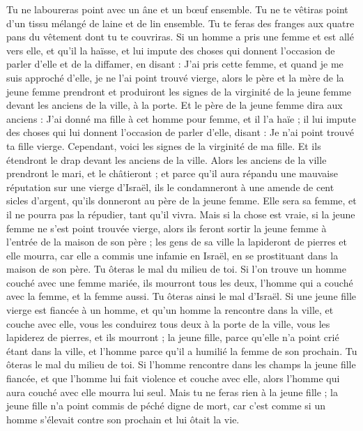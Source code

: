 \begin{multicols}{2}
Tu ne laboureras point avec un âne et un bœuf ensemble.
Tu ne te vêtiras point d'un tissu mélangé de laine et de lin ensemble.
Tu te feras des franges aux quatre pans du vêtement dont tu te couvriras.
Si un homme a pris une femme et est allé vers elle, et qu'il la haïsse,
et lui impute des choses qui donnent l'occasion de parler d'elle et de la diffamer, en disant : J'ai pris cette femme, et quand je me suis approché d'elle, je ne l'ai point trouvé vierge,
alors le père et la mère de la jeune femme prendront et produiront les signes de la virginité de la jeune femme devant les anciens de la ville, à la porte.
Et le père de la jeune femme dira aux anciens : J'ai donné ma fille à cet homme pour femme, et il l'a haïe ;
il lui impute des choses qui lui donnent l'occasion de parler d'elle, disant : Je n'ai point trouvé ta fille vierge. Cependant, voici les signes de la virginité de ma fille. Et ils étendront le drap devant les anciens de la ville.
Alors les anciens de la ville prendront le mari, et le châtieront ;
et parce qu'il aura répandu une mauvaise réputation sur une vierge d'Israël, ils le condamneront à une amende de cent sicles d'argent, qu'ils donneront au père de la jeune femme. Elle sera sa femme, et il ne pourra pas la répudier, tant qu'il vivra.
Mais si la chose est vraie, si la jeune femme ne s'est point trouvée vierge,
alors ils feront sortir la jeune femme à l'entrée de la maison de son père ; les gens de sa ville la lapideront de pierres et elle mourra, car elle a commis une infamie en Israël, en se prostituant dans la maison de son père. Tu ôteras le mal du milieu de toi.
Si l'on trouve un homme couché avec une femme mariée, ils mourront tous les deux, l'homme qui a couché avec la femme, et la femme aussi. Tu ôteras ainsi le mal d'Israël.
Si une jeune fille vierge est fiancée à un homme, et qu'un homme la rencontre dans la ville, et couche avec elle,
vous les conduirez tous deux à la porte de la ville, vous les lapiderez de pierres, et ils mourront ; la jeune fille, parce qu'elle n'a point crié étant dans la ville, et l'homme parce qu'il a humilié la femme de son prochain. Tu ôteras le mal du milieu de toi.
Si l'homme rencontre dans les champs la jeune fille fiancée, et que l'homme lui fait violence et couche avec elle, alors l'homme qui aura couché avec elle mourra lui seul.
Mais tu ne feras rien à la jeune fille ; la jeune fille n'a point commis de péché digne de mort, car c'est comme si un homme s'élevait contre son prochain et lui ôtait la vie.

\end{multicols}
